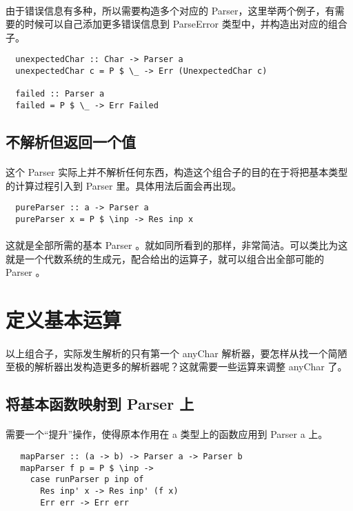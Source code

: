 \documentclass{article}
\begin{document}
  \paragraph{}
   由于错误信息有多种，所以需要构造多个对应的 Parser，这里举两个例子，有需要的时候可以自己添加更多错误信息到 ParseError 类型中，并构造出对应的组合子。
  \begin{lstlisting}
  unexpectedChar :: Char -> Parser a
  unexpectedChar c = P $ \_ -> Err (UnexpectedChar c)
  
  failed :: Parser a
  failed = P $ \_ -> Err Failed
  \end{lstlisting}
 \subsection{不解析但返回一个值}
  \paragraph{}
   这个 Parser 实际上并不解析任何东西，构造这个组合子的目的在于将把基本类型的计算过程引入到 Parser 里。具体用法后面会再出现。
  \begin{lstlisting}
  pureParser :: a -> Parser a
  pureParser x = P $ \inp -> Res inp x
  \end{lstlisting}
  \paragraph{}
  这就是全部所需的基本 Parser 。就如同所看到的那样，非常简洁。可以类比为这就是一个代数系统的生成元，配合给出的运算子，就可以组合出全部可能的 Parser 。
 \section{定义基本运算}
   \paragraph{}
    以上组合子，实际发生解析的只有第一个 anyChar 解析器，要怎样从找一个简陋至极的解析器出发构造更多的解析器呢？这就需要一些运算来调整 anyChar 了。
  \subsection{将基本函数映射到 Parser 上}
   \paragraph{}
    需要一个“提升”操作，使得原本作用在 a 类型上的函数应用到 Parser a 上。
   \begin{lstlisting}
   mapParser :: (a -> b) -> Parser a -> Parser b
   mapParser f p = P $ \inp ->
     case runParser p inp of
       Res inp' x -> Res inp' (f x)
       Err err -> Err err
   \end{lstlisting} 
\end{document}

